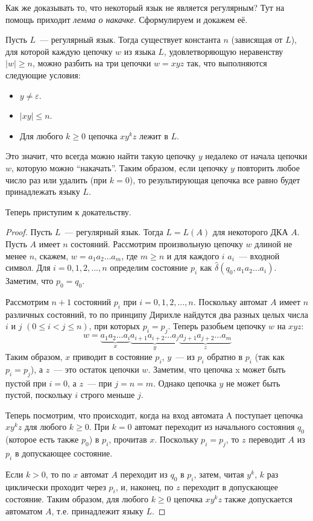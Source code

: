 \documentclass[a4paper,12pt]{article}
\begin{document}
	Как же доказывать то, что некоторый язык не является регулярным? Тут на помощь приходит \textit{лемма о накачке}. Сформулируем и докажем её.
	\begin{pumping-lemma}
		Пусть $L$~--- регулярный язык. Тогда существует константа $n$ (зависящая от $L$), для которой каждую цепочку $w$ из языка $L$, удовлетворяющую неравенству $|w| \geqslant n$, можно разбить на три цепочки $w = xyz$ так, что выполняются следующие условия:
		\begin{itemize}
			\item $y \neq \varepsilon$.
			\item $|xy| \leqslant n$.
			\item Для любого $k \geqslant 0$ цепочка $xy^kz$ лежит в $L$.
		\end{itemize}
	\end{pumping-lemma}
	Это значит, что всегда можно найти такую цепочку $y$ недалеко от начала цепочки $w$, которую можно ``накачать''. Таким образом, если цепочку $y$ повторить любое число раз или удалить (при $k = 0$), то результирующая цепочка все равно будет принадлежать языку $L$.
	
	Теперь приступим к докательству.
	\begin{proof}
		Пусть $L$~--- регулярный язык. Тогда $L = L(A)$ для некоторого ДКА $A$. Пусть $A$ имеет $n$ состояний. Рассмотрим произвольную цепочку $w$ длиной не менее $n$, скажем, $w = a_1 a_2 \ldots a_m$, где $m \geqslant n$ и для каждого $i$ $a_i$~--- входной символ. Для $i= 0, 1, 2, ...,n$ определим состояние $p_i$ как $\hat{\delta}(q_0, a_1 a_2 \ldots a_i)$. Заметим, что $p_0 = q_0$.
		
		Рассмотрим $n + 1$ состояний $p_i$ при $i = 0, 1, 2, ..., n$. Поскольку автомат $A$ имеет $n$ различных состояний, то по принципу Дирихле найдутся два разных целых числа $i$ и $j$ $(0 \leqslant i < j \leqslant n)$, при которых $p_i = p_j$. Теперь разобьем цепочку $w$ на $xyz$:
		\[w = \underbrace{a_1 a_2 \ldots a_i}_{x}\underbrace{a_{i + 1} a_{i + 2} \ldots a_j}_{y}\underbrace{a_{j + 1} a_{j + 2} \ldots a_m}_{z}\]
		Таким образом, $x$ приводит в состояние $p_i$, $y$~--- из $p_i$ обратно в $p_i$ (так как $p_i = p_j$), а $z$~--- это остаток цепочки $w$. Заметим, что цепочка x может быть пустой при $i = 0$, а $z$~--- при $j = n = m$. Однако цепочка $y$ не может быть пустой, поскольку $i$ строго меньше $j$.
		
		Теперь посмотрим, что происходит, когда на вход автомата A поступает цепочка $xy^kz$ для любого $k \geqslant 0$. При $k = 0$ автомат переходит из начального состояния $q_0$ (которое есть также $p_0$) в $p_i$, прочитав $x$. Поскольку $p_i = p_j$, то $z$ переводит $A$ из $p_i$ в допускающее состояние.
		
		Если $k > 0$, то по $x$ автомат $A$ переходит из $q_0$ в $p_i$, затем, читая $y^k$, $k$ раз циклически проходит через $p_i$, и, наконец, по $z$ переходит в допускающее состояние. Таким образом, для любого $k \geqslant 0$ цепочка $xy^kz$ также допускается автоматом $A$, т.е. принадлежит языку $L$.
	\end{proof}
	
\end{document}

